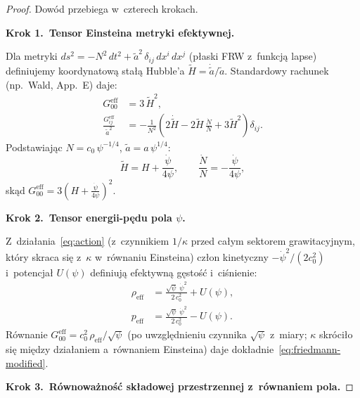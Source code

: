 \begin{proof}
Dow\'od przebiega w~czterech krokach.

\medskip\noindent
\textbf{Krok 1.\ Tensor Einsteina metryki efektywnej.}\nopagebreak

Dla metryki $ds^2 = -N^2\,dt^2
+ \tilde a^2\,\delta_{ij}\,dx^i\,dx^j$ (p\l{}aski FRW
z~funkcj\k{a} lapse) definiujemy koordynatow\k{a}
sta\l{}\k{a} Hubble'a $\tilde H = \dot{\tilde a}/\tilde a$.
Standardowy rachunek (np.\ Wald, App.~E) daje:
\begin{align}
  G^{\mathrm{eff}}_{00}
    &= 3\,\tilde H^2,
    \label{eq:G00-eff}\\[4pt]
  \frac{G^{\mathrm{eff}}_{ij}}{\tilde a^2}
    &= -\frac{1}{N^2}\!\left(
      2\dot{\tilde H}
      - 2\tilde H\,\frac{\dot N}{N}
      + 3\tilde H^2
    \right)\delta_{ij}.
    \label{eq:Gij-eff}
\end{align}
Podstawiaj\k{a}c $N = c_0\,\psi^{-1/4}$,
$\tilde a = a\,\psi^{1/4}$:
\begin{equation}\label{eq:Htilde-def}
  \tilde H = H + \frac{\dot\psi}{4\psi},
  \qquad
  \frac{\dot N}{N} = -\frac{\dot\psi}{4\psi},
\end{equation}
sk\k{a}d
$G^{\mathrm{eff}}_{00}
= 3\!\left(H + \frac{\dot\psi}{4\psi}\right)^{\!2}$.

\medskip\noindent
\textbf{Krok 2.\ Tensor energii-p\k{e}du pola $\psi$.}\nopagebreak

Z~dzia\l{}ania~\eqref{eq:action} (z~czynnikiem $1/\kappa$
przed ca\l{}ym sektorem grawitacyjnym, kt\'ory skraca si\k{e}
z~$\kappa$ w~r\'ownaniu Einsteina) cz\l{}on kinetyczny
$-\dot\psi^2/(2 c_0^2)$ i~potencja\l{} $U(\psi)$ definiuj\k{a}
efektywn\k{a} g\k{e}sto\'s\'c i~ci\'snienie:
\begin{align}
  \rho_{\mathrm{eff}}
    &= \frac{\sqrt\psi\;\dot\psi^2}{2\,c_0^2} + U(\psi),
    \label{eq:rho-eff}\\
  p_{\mathrm{eff}}
    &= \frac{\sqrt\psi\;\dot\psi^2}{2\,c_0^2} - U(\psi).
    \label{eq:p-eff}
\end{align}
R\'ownanie
$G^{\mathrm{eff}}_{00} = c_0^2\,\rho_{\mathrm{eff}}/\sqrt\psi$
(po uwzgl\k{e}dnieniu czynnika $\sqrt\psi$ z~miary;
$\kappa$ skr\'oci\l{}o si\k{e} mi\k{e}dzy dzia\l{}aniem a~r\'ownaniem
Einsteina) daje dok\l{}adnie~\eqref{eq:friedmann-modified}.

\medskip\noindent
\textbf{Krok 3.\ R\'ownowa\.zno\'s\'c sk\l{}adowej
przestrzennej z~r\'ownaniem pola.}\nopagebreak


\end{proof}
